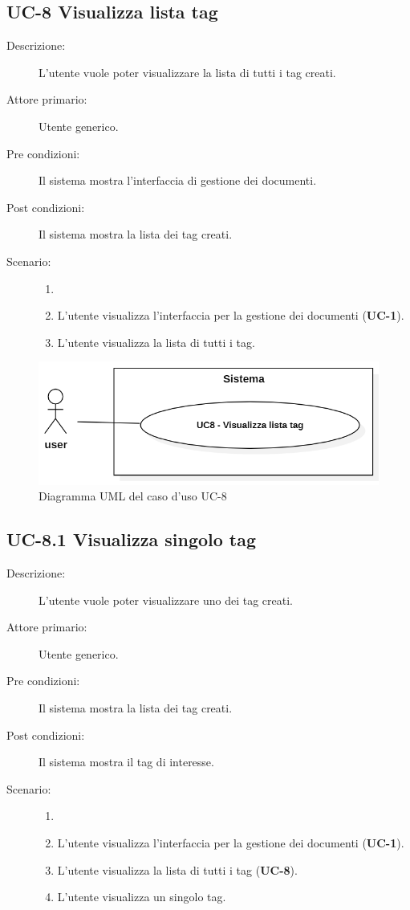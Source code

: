 \subsection{UC-8 Visualizza lista tag}
\begin{description}
    \item[Descrizione:] L’utente vuole poter visualizzare la lista di tutti i tag creati.
    \item[Attore primario:] Utente generico.
    \item[Pre condizioni:] Il sistema mostra l'interfaccia di gestione dei documenti.
    \item[Post condizioni:] Il sistema mostra la lista dei tag creati.
    \item[Scenario:]
    \begin{enumerate}
        \item[] 
        \item L’utente visualizza l'interfaccia per la gestione dei documenti (\textbf{UC-1}).
        \item L’utente visualizza la lista di tutti i tag.
    \end{enumerate}
\end{description}
\begin{figure}[H]
    \centering
    \includegraphics[width=0.8\linewidth]{UC8.PNG}
    \caption{Diagramma UML del caso d'uso UC-8}
    \label{fig:UC8}
\end{figure}

\subsection{UC-8.1 Visualizza singolo tag}
\begin{description}
    \item[Descrizione:] L’utente vuole poter visualizzare uno dei tag creati.
    \item[Attore primario:] Utente generico.
    \item[Pre condizioni:] Il sistema mostra la lista dei tag creati.
    \item[Post condizioni:] Il sistema mostra il tag di interesse.
    \item[Scenario:]
    \begin{enumerate}
        \item[] 
        \item L’utente visualizza l'interfaccia per la gestione dei documenti (\textbf{UC-1}).
        \item L’utente visualizza la lista di tutti i tag (\textbf{UC-8}).
        \item L'utente visualizza un singolo tag.
    \end{enumerate}
\end{description}

